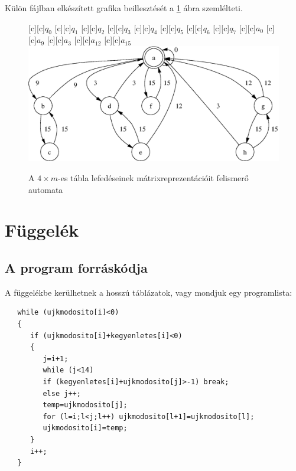 \newpage

Külön fájlban elkészített grafika beillesztését a \ref{abra-automata} ábra szemlélteti.
\begin{figure}[h]
	\centering
	[c]{$q_0$}
	[c]{$q_1$}
	[c]{$q_2$}
	[c]{$q_3$}
	[c]{$q_4$}
	[c]{$q_5$}
	[c]{$q_6$}
	[c]{$q_7$}
	[c]{$a_{0}$}
	[c]{$a_{9}$}
	[c]{$a_{3}$}
	[c]{$a_{12}$}
	[c]{$a_{15}$}
	\includegraphics[scale=0.8]{abra.eps}
	\caption{\label{abra-automata} A $4\times m$-es tábla lefedéseinek mátrixreprezentációit felismerő automata}
\end{figure}


\chapter{Függelék}

\section{A program forráskódja}
A függelékbe kerülhetnek a hosszú táblázatok, vagy mondjuk egy programlista:
\begin{verbatim}
   while (ujkmodosito[i]<0)
   {
      if (ujkmodosito[i]+kegyenletes[i]<0)
      {
         j=i+1;
         while (j<14)
         if (kegyenletes[i]+ujkmodosito[j]>-1) break;
         else j++;
         temp=ujkmodosito[j];
         for (l=i;l<j;l++) ujkmodosito[l+1]=ujkmodosito[l];
         ujkmodosito[i]=temp;
      }
      i++;
   }
\end{verbatim}


